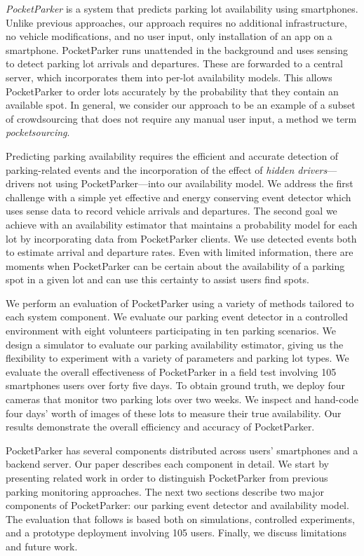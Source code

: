 \textit{PocketParker} is a system that predicts parking lot availability using
smartphones. Unlike previous approaches, our approach requires no additional
infrastructure, no vehicle modifications, and no user input, only installation
of an app on a smartphone.  PocketParker runs unattended in the background and
uses sensing to detect parking lot arrivals and departures.  These are
forwarded to a central server, which incorporates them into per-lot
availability models.  This allows PocketParker to order lots accurately by the
probability that they contain an available spot.  In general, we consider our
approach to be an example of a subset of crowdsourcing that does not require
any manual user input, a method we term \textit{pocketsourcing}.

Predicting parking availability requires the efficient and accurate detection
of parking-related events and the incorporation of the effect of
\textit{hidden drivers}---drivers not using PocketParker---into our
availability model. We address the first challenge with a simple yet effective
and energy conserving event detector which uses sense data to record vehicle
arrivals and departures.  The second goal we achieve with an availability
estimator that maintains a probability model for each lot by incorporating
data from PocketParker clients. We use detected events both to estimate
arrival and departure rates.  Even with limited information, there are moments
when PocketParker can be certain about the availability of a parking spot in a
given lot and can use this certainty to assist users find spots.

We perform an evaluation of PocketParker using a variety of methods
tailored to each system component. We evaluate our parking event detector in
a controlled environment with eight volunteers participating in ten parking
scenarios. We design a simulator to evaluate our parking availability
estimator, giving us the flexibility to experiment with a variety of
parameters and parking lot types. We evaluate the overall effectiveness of
PocketParker in a field test involving 105 smartphones users over forty five
days. To obtain ground truth, we deploy four cameras that monitor two parking
lots over two weeks. We inspect and hand-code four days' worth of images of
these lots to measure their true availability. Our results demonstrate the
overall efficiency and accuracy of PocketParker.

PocketParker has several components distributed across users' smartphones and
a backend server. Our paper describes each component in detail. We start by
presenting related work in order to distinguish PocketParker from previous
parking monitoring approaches. The next two sections describe two major
components of PocketParker: our parking event detector and availability model.
The evaluation that follows is based both on simulations, controlled
experiments, and a prototype deployment involving 105 users.  Finally, we
discuss limitations and future work.

